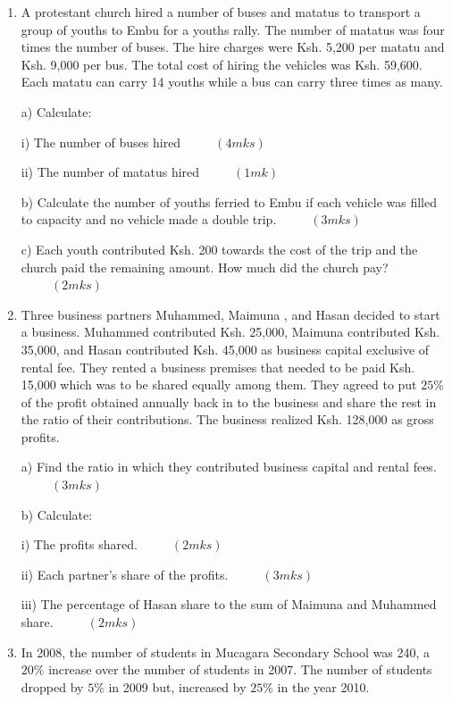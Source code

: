 \documentclass[
  a4paperpaper,
]{scrbook}
\begin{document}
\begin{tcolorbox}
\begin{enumerate}
\def\labelenumi{\arabic{enumi}.}
\setcounter{enumi}{16}
\item
  A protestant church hired a number of buses and matatus to transport a
  group of youths to Embu for a youths rally. The number of matatus was
  four times the number of buses. The hire charges were Ksh. 5,200 per
  matatu and Ksh. 9,000 per bus. The total cost of hiring the vehicles
  was Ksh. 59,600. Each matatu can carry 14 youths while a bus can carry
  three times as many.

  a) Calculate:

  i) The number of buses hired \(\hspace{1cm} (4mks)\)

  ii) The number of matatus hired \(\hspace{1cm} (1mk)\)

  b) Calculate the number of youths ferried to Embu if each vehicle was
  filled to capacity and no vehicle made a double trip.
  \(\hspace{1cm} (3mks)\)

  c) Each youth contributed Ksh. 200 towards the cost of the trip and
  the church paid the remaining amount. How much did the church pay?
  \(\hspace{1cm} (2mks)\)
\item
  Three business partners Muhammed, Maimuna , and Hasan decided to start
  a business. Muhammed contributed Ksh. 25,000, Maimuna contributed Ksh.
  35,000, and Hasan contributed Ksh. 45,000 as business capital
  exclusive of rental fee. They rented a business premises that needed
  to be paid Ksh. 15,000 which was to be shared equally among them. They
  agreed to put \(25\%\) of the profit obtained annually back in to the
  business and share the rest in the ratio of their contributions. The
  business realized Ksh. 128,000 as gross profits.

  a) Find the ratio in which they contributed business capital and
  rental fees. \(\hspace{1cm} (3mks)\)

  b) Calculate:

  i) The profits shared. \(\hspace{1cm} (2mks)\)

  ii) Each partner's share of the profits. \(\hspace{1cm} (3mks)\)

  iii) The percentage of Hasan share to the sum of Maimuna and Muhammed
  share. \(\hspace{1cm}(2mks)\)
\item
  In 2008, the number of students in Mucagara Secondary School was 240,
  a \(20\%\) increase over the number of students in 2007. The number of
  students dropped by \(5\%\) in 2009 but, increased by \(25\%\) in the
  year 2010.


\end{enumerate}
\end{tcolorbox}
\end{document}
